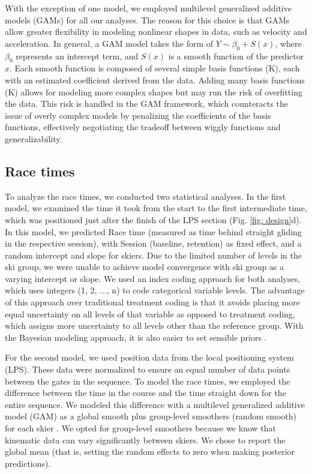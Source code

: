 \documentclass{article}
\begin{document}
 With the exception of one model, we employed multilevel generalized additive models (GAMs) \cite{pedersen_hierarchical_2019} for all our analyses. The reason for this choice is that GAMs allow greater flexibility in modeling nonlinear shapes in data, such as velocity and acceleration. In general, a GAM model takes the form of $Y \sim \beta_0 + S(x)$, where $\beta_0$ represents an intercept term, and $S(x)$ is a smooth function of the predictor $x$. Each smooth function is composed of several simple basis functions (K), each with an estimated coefficient derived from the data. Adding many basis functions (K) allows for modeling more complex shapes but may run the risk of overfitting the data. This risk is handled in the GAM framework, which counteracts the issue of overly complex models by penalizing the coefficients of the basis functions, effectively negotiating the tradeoff between wiggly functions and generalizability.

\subsection{Race times}
To analyze the race times, we conducted two statistical analyses. In the first model, we examined the time it took from the start to the first intermediate time, which was positioned just after the finish of the LPS section (Fig. \ref{fig: design}d). In this model, we predicted Race time (measured as time behind straight gliding in the respective session), with Session (baseline, retention) as fixed effect, and a random intercept and slope for skiers. Due to the limited number of levels in the ski group, we were unable to achieve model convergence with ski group as a varying intercept or slope. We used an index coding approach for both analyses, which uses integers (1, 2, ..., n) to code categorical variable levels. The advantage of this approach over traditional treatment coding is that it avoids placing more equal uncertainty on all levels of that variable as opposed to treatment coding, which assigns more uncertainty to all levels other than the reference group. With the Bayesian modeling approach, it is also easier to set sensible priors \cite{mcelreath_statistical_2018}. 

For the second model, we used position data from the local positioning system (LPS). These data were normalized to ensure an equal number of data points between the gates in the sequence. To model the race times, we employed the difference between the time in the course and the time straight down for the entire sequence. We modeled this difference with a multilevel generalized additive model (GAM) as a global smooth plus group-level smoothers (random smooth) for each skier \cite{pedersen_hierarchical_2019}. We opted for group-level smoothers because we know that kinematic data can vary significantly between skiers. We chose to report the global mean (that is, setting the random effects to zero when making posterior predictions). 
\end{document}
